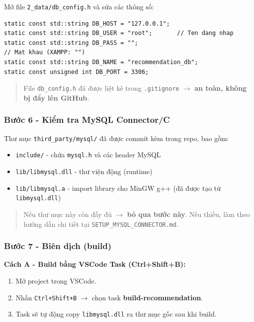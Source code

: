 \documentclass{report}
\begin{document}
Mở file \texttt{2\_data/db\_config.h} và sửa các thông số:
\begin{lstlisting}[caption={Nội dung db\_config.h cần chỉnh sửa}]
static const std::string DB_HOST = "127.0.0.1";
static const std::string DB_USER = "root";       // Ten dang nhap
static const std::string DB_PASS = "";
// Mat khau (XAMPP: "")
static const std::string DB_NAME = "recommendation_db";
static const unsigned int DB_PORT = 3306;
\end{lstlisting}

\begin{quote}
File \texttt{db\_config.h} đã được liệt kê trong \texttt{.gitignore} $\rightarrow$ \textbf{an toàn, không bị đẩy lên GitHub}.
\end{quote}

\subsubsection*{Bước 6 - Kiểm tra MySQL Connector/C}

Thư mục \texttt{third\_party/mysql/} đã được commit kèm trong repo, bao gồm:
\begin{itemize}
    \item \texttt{include/} - chứa \texttt{mysql.h} và các header MySQL
    \item \texttt{lib/libmysql.dll} - thư viện động (runtime)
    \item \texttt{lib/libmysql.a} - import library cho MinGW g++ (đã được tạo từ \texttt{libmysql.dll})
\end{itemize}

\begin{quote}
Nếu thư mục này còn đầy đủ $\rightarrow$ \textbf{bỏ qua bước này}. Nếu thiếu, làm theo hướng dẫn chi tiết tại \texttt{SETUP\_MYSQL\_CONNECTOR.md}.
\end{quote}

\subsubsection*{Bước 7 - Biên dịch (build)}

\textbf{Cách A - Build bằng VSCode Task (Ctrl+Shift+B):}
\begin{enumerate}
    \item Mở project trong VSCode.
    \item Nhấn \texttt{Ctrl+Shift+B} $\rightarrow$ chọn task \textbf{build-recommendation}.
    \item Task sẽ tự động copy \texttt{libmysql.dll} ra thư mục gốc sau khi build.
\end{enumerate}
\end{document}
